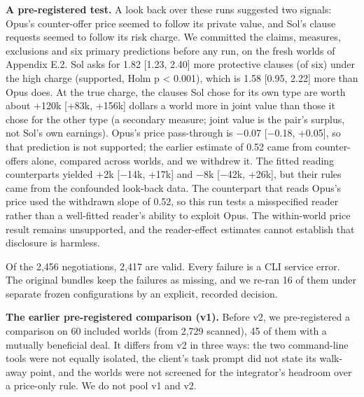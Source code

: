 \textbf{A pre-registered test.} A look back over these runs suggested two signals: Opus's counter-offer price seemed
to follow its private value, and Sol's clause requests seemed to follow its risk charge. We committed the claims,
measures, exclusions and six primary predictions before any run, on the fresh worlds of Appendix E.2. Sol asks for
1.82 {[}1.23, 2.40{]} more protective clauses (of six) under the high charge (supported, Holm p \textless{} 0.001), which is 1.58
{[}0.95, 2.22{]} more than Opus does. At the true charge, the clauses Sol chose for its own type are worth about +120k
{[}+83k, +156k{]} dollars a world more in joint value than those it chose for the other type (a secondary measure;
joint value is the pair's surplus, not Sol's own earnings). Opus's price pass-through is −0.07 {[}−0.18, +0.05{]}, so
that prediction is not supported; the earlier estimate of 0.52 came from counter-offers alone, compared across
worlds, and we withdrew it. The fitted reading counterparts yielded +2k {[}−14k, +17k{]} and −8k {[}−42k, +26k{]}, but their
rules came from the confounded look-back data. The counterpart that reads Opus's price used the withdrawn slope of
0.52, so this run tests a misspecified reader rather than a well-fitted reader's ability to exploit Opus. The
within-world price result remains unsupported, and the reader-effect estimates cannot establish that disclosure is
harmless.

Of the 2,456 negotiations, 2,417 are valid. Every failure is a CLI service error. The original bundles keep the
failures as missing, and we re-ran 16 of them under separate frozen configurations by an explicit, recorded
decision.

\textbf{The earlier pre-registered comparison (v1).} Before v2, we pre-registered a comparison on 60 included worlds
(from 2,729 scanned), 45 of them with a mutually beneficial deal. It differs from v2 in three ways: the two
command-line tools were not equally isolated, the client's task prompt did not state its walk-away point, and the
worlds were not screened for the integrator's headroom over a price-only rule. We do not pool v1 and v2.

